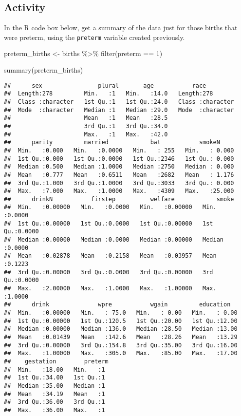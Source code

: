 \documentclass[
]{article}
\newenvironment{Shaded}{\begin{snugshade}}{\end{snugshade}}
\newcommand{\DecValTok}[1]{\textcolor[rgb]{0.00,0.00,0.81}{#1}}
\newcommand{\FunctionTok}[1]{\textcolor[rgb]{0.00,0.00,0.00}{#1}}
\newcommand{\NormalTok}[1]{#1}
\newcommand{\OtherTok}[1]{\textcolor[rgb]{0.56,0.35,0.01}{#1}}
\newcommand{\SpecialCharTok}[1]{\textcolor[rgb]{0.00,0.00,0.00}{#1}}
\begin{document}
\hypertarget{activity}{%
\subsection{Activity}\label{activity}}

In the R code box below, get a summary of the data just for those births
that were preterm, using the \texttt{preterm} variable created
previously.

\begin{Shaded}
\begin{Highlighting}[]
\NormalTok{preterm\_births }\OtherTok{\textless{}{-}}\NormalTok{ births }\SpecialCharTok{\%\textgreater{}\%} \FunctionTok{filter}\NormalTok{(preterm }\SpecialCharTok{==} \DecValTok{1}\NormalTok{)}

\FunctionTok{summary}\NormalTok{(preterm\_births)}
\end{Highlighting}
\end{Shaded}

\begin{verbatim}
##      sex                plural       age           race          
##  Length:278         Min.   :1   Min.   :14.0   Length:278        
##  Class :character   1st Qu.:1   1st Qu.:24.0   Class :character  
##  Mode  :character   Median :1   Median :29.0   Mode  :character  
##                     Mean   :1   Mean   :28.5                     
##                     3rd Qu.:1   3rd Qu.:34.0                     
##                     Max.   :1   Max.   :42.0                     
##      parity         married            bwt           smokeN      
##  Min.   :0.000   Min.   :0.0000   Min.   : 255   Min.   : 0.000  
##  1st Qu.:0.000   1st Qu.:0.0000   1st Qu.:2346   1st Qu.: 0.000  
##  Median :0.500   Median :1.0000   Median :2750   Median : 0.000  
##  Mean   :0.777   Mean   :0.6511   Mean   :2682   Mean   : 1.176  
##  3rd Qu.:1.000   3rd Qu.:1.0000   3rd Qu.:3033   3rd Qu.: 0.000  
##  Max.   :7.000   Max.   :1.0000   Max.   :4309   Max.   :25.000  
##      drinkN           firstep          welfare            smoke       
##  Min.   :0.00000   Min.   :0.0000   Min.   :0.00000   Min.   :0.0000  
##  1st Qu.:0.00000   1st Qu.:0.0000   1st Qu.:0.00000   1st Qu.:0.0000  
##  Median :0.00000   Median :0.0000   Median :0.00000   Median :0.0000  
##  Mean   :0.02878   Mean   :0.2158   Mean   :0.03957   Mean   :0.1223  
##  3rd Qu.:0.00000   3rd Qu.:0.0000   3rd Qu.:0.00000   3rd Qu.:0.0000  
##  Max.   :2.00000   Max.   :1.0000   Max.   :1.00000   Max.   :1.0000  
##      drink              wpre           wgain         education    
##  Min.   :0.00000   Min.   : 75.0   Min.   : 0.00   Min.   : 0.00  
##  1st Qu.:0.00000   1st Qu.:120.5   1st Qu.:20.00   1st Qu.:12.00  
##  Median :0.00000   Median :136.0   Median :28.50   Median :13.00  
##  Mean   :0.01439   Mean   :142.6   Mean   :28.26   Mean   :13.29  
##  3rd Qu.:0.00000   3rd Qu.:154.8   3rd Qu.:35.00   3rd Qu.:16.00  
##  Max.   :1.00000   Max.   :305.0   Max.   :85.00   Max.   :17.00  
##    gestation        preterm 
##  Min.   :18.00   Min.   :1  
##  1st Qu.:34.00   1st Qu.:1  
##  Median :35.00   Median :1  
##  Mean   :34.19   Mean   :1  
##  3rd Qu.:36.00   3rd Qu.:1  
##  Max.   :36.00   Max.   :1
\end{verbatim}
\end{document}

